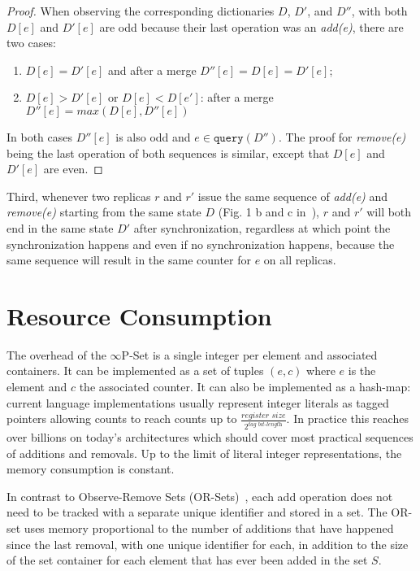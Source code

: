 \documentclass[11pt, oneside]{article}   	%
\begin{document}
\begin{proof}
When observing the corresponding dictionaries $D$, $D'$, and $D''$, with both $D[e]$ and $D'[e]$ are odd because their last operation was an \textit{add(e)}, there are two cases:
\begin{enumerate}
    \item $D[e]=D'[e]$ and after a merge $D''[e]=D[e]=D'[e]$;
    \item $D[e]>D'[e]$ or $D[e]<D[e']$: after a merge $D''[e]=max(D[e], D''[e])$
\end{enumerate}   

In both cases $D''[e]$ is also odd and $e \in  \texttt{query}(D'')$.  The proof for \textit{remove(e)} being the last operation of both sequences is similar, except that $D[e]$ and $D'[e]$ are even.
\end{proof}

Third, whenever two replicas $r$ and $r'$ issue the same sequence of \textit{add(e)} and \textit{remove(e)} starting from the same state $D$ (Fig. 1 b and c in~\cite{bieniusa:hal-00769554}), $r$ and $r'$ will both end in the same state $D'$ after synchronization, regardless at which point the synchronization happens and even if no synchronization happens, because the same sequence will result in the same counter for $e$ on all replicas.

\section{Resource Consumption}
\label{sec:resource-consumption}

The overhead of the $\infty$P-Set is a single integer per element and associated containers. It can be implemented as a set of tuples $(e,c)$ where $e$ is the element and $c$ the associated counter. It can also be implemented as a hash-map: current language implementations usually represent integer literals as tagged pointers allowing counts to reach counts up to 
$\frac{\textit{register size}}{2^\textit{tag bit-length}}$. In practice this reaches over billions on today's architectures which should cover most practical sequences of additions and removals. Up to the limit of literal integer representations, the memory consumption is constant.

In contrast to Observe-Remove Sets (OR-Sets)~\cite{shapiro:inria-00555588}, each add operation does not need to be tracked with a separate unique identifier and stored in a set. The OR-set uses memory proportional to the number of additions that have happened since the last removal, with one unique identifier for each, in addition to the size of the set container for each element that has ever been added in the set $S$.
\end{document}
